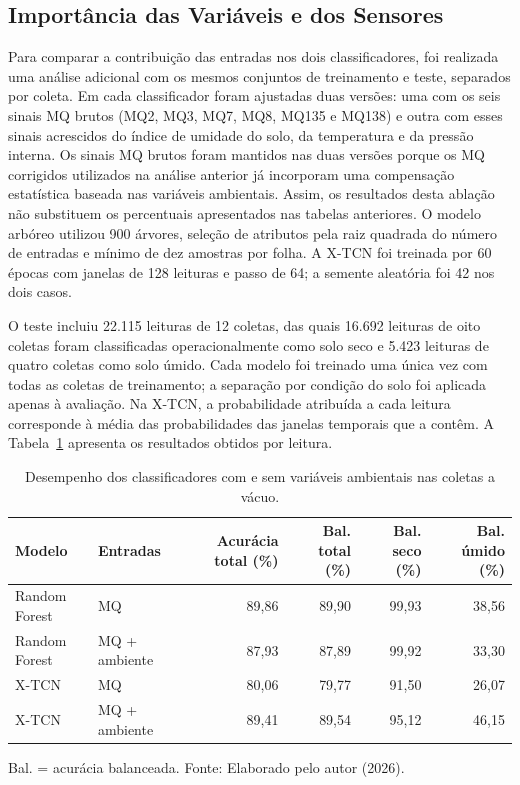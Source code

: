\subsection{Importância das Variáveis e dos Sensores}

Para comparar a contribuição das entradas nos dois classificadores, foi
realizada uma análise adicional com os mesmos conjuntos de treinamento e teste,
separados por coleta. Em cada classificador foram ajustadas duas versões: uma
com os seis sinais MQ brutos (MQ2, MQ3, MQ7, MQ8, MQ135 e MQ138) e outra com
esses sinais acrescidos do índice de umidade do solo, da temperatura e da
pressão interna. Os sinais MQ brutos foram mantidos nas duas versões porque os
MQ corrigidos utilizados na análise anterior já incorporam uma compensação
estatística baseada nas variáveis ambientais. Assim, os resultados desta
ablação não substituem os percentuais apresentados nas tabelas anteriores.
O modelo arbóreo utilizou 900 árvores, seleção de atributos pela raiz
quadrada do número de entradas e mínimo de dez amostras por folha. A X-TCN
foi treinada por 60 épocas com janelas de 128 leituras e passo de 64; a
semente aleatória foi 42 nos dois casos.

O teste incluiu 22.115 leituras de 12 coletas, das quais 16.692 leituras de
oito coletas foram classificadas operacionalmente como solo seco e 5.423
leituras de quatro coletas como solo úmido. Cada modelo foi treinado uma única
vez com todas as coletas de treinamento; a separação por condição do solo foi
aplicada apenas à avaliação. Na X-TCN, a probabilidade atribuída a cada
leitura corresponde à média das probabilidades das janelas temporais que a
contêm. A Tabela~\ref{tab:ablacao_ambiente_vacuo} apresenta os resultados
obtidos por leitura.

\begin{table}[htbp]
    \centering
    \caption{Desempenho dos classificadores com e sem variáveis ambientais nas coletas a vácuo.}
    \label{tab:ablacao_ambiente_vacuo}
    \scriptsize
    \begin{tabular}{llrrrr}
        \hline
        \textbf{Modelo} & \textbf{Entradas} &
        \textbf{Acurácia total (\%)} &
        \textbf{Bal. total (\%)} &
        \textbf{Bal. seco (\%)} &
        \textbf{Bal. úmido (\%)} \\
        \hline
        Random Forest & MQ              & 89,86 & 89,90 & 99,93 & 38,56 \\
        Random Forest & MQ + ambiente   & 87,93 & 87,89 & 99,92 & 33,30 \\
        X-TCN         & MQ              & 80,06 & 79,77 & 91,50 & 26,07 \\
        X-TCN         & MQ + ambiente   & 89,41 & 89,54 & 95,12 & 46,15 \\
        \hline
    \end{tabular}

    \vspace{0.1cm}
    {\footnotesize Bal. = acurácia balanceada. Fonte: Elaborado pelo autor (2026).}
\end{table}

